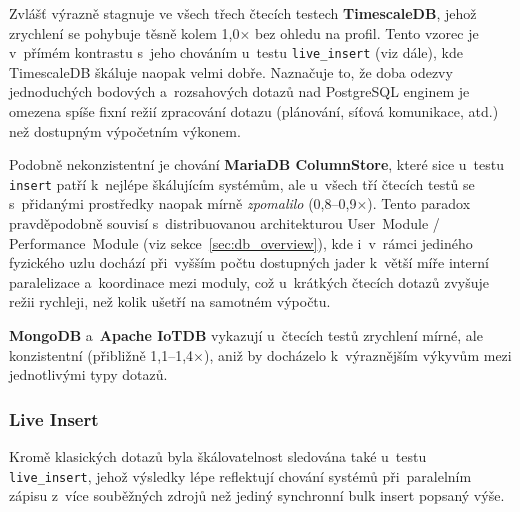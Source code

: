 Zvlášť výrazně stagnuje ve všech třech čtecích testech \textbf{TimescaleDB}, jehož zrychlení se pohybuje těsně kolem 1,0$\times$ bez ohledu na profil. 
Tento vzorec je v~přímém kontrastu s~jeho chováním u~testu \texttt{live\_insert} (viz dále), kde TimescaleDB škáluje naopak velmi dobře. 
Naznačuje to, že doba odezvy jednoduchých bodových a~rozsahových dotazů nad PostgreSQL enginem je omezena spíše fixní režií zpracování dotazu (plánování, síťová komunikace, atd.) než dostupným výpočetním výkonem.

Podobně nekonzistentní je chování \textbf{MariaDB ColumnStore}, které sice u~testu \texttt{insert} patří k~nejlépe škálujícím systémům, ale u~všech tří čtecích testů se s~přidanými prostředky naopak mírně \emph{zpomalilo} (0,8--0,9$\times$). 
Tento paradox pravděpodobně souvisí s~distribuovanou architekturou User~Module / Performance~Module (viz sekce~\ref{sec:db_overview}), kde i~v~rámci jediného fyzického 
uzlu dochází při~vyšším počtu dostupných jader k~větší míře interní paralelizace a~koordinace mezi moduly, což u~krátkých čtecích dotazů zvyšuje režii rychleji, než kolik ušetří na samotném výpočtu.

\textbf{MongoDB} a~\textbf{Apache IoTDB} vykazují u~čtecích testů zrychlení mírné, ale konzistentní (přibližně 1,1--1,4$\times$), aniž by docházelo k~výraznějším výkyvům mezi jednotlivými typy dotazů.

\subsubsection{Live Insert}

Kromě klasických dotazů byla škálovatelnost sledována také u~testu 
\texttt{live\_insert}, jehož výsledky lépe reflektují chování systémů 
při~paralelním zápisu z~více souběžných zdrojů než jediný synchronní 
bulk insert popsaný výše.

